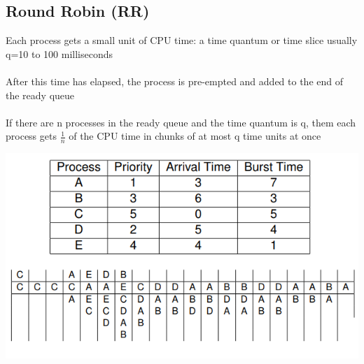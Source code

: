 \documentclass{article}[18pt]
\begin{document}
\subsection{Round Robin (RR)}
Each process gets a small unit of CPU time: a time quantum or time slice usually q=10 to 100 milliseconds\\
\\
After this time has elapsed, the process is pre-empted and added to the end of the ready queue\\
\\
If there are n processes in the ready queue and the time quantum is q, them each process gets $\frac{1}{n}$ of the CPU time in chunks of at most q time units at once
\begin{center}
\includegraphics[scale=0.7]{RR}
\end{center}
\end{document}
